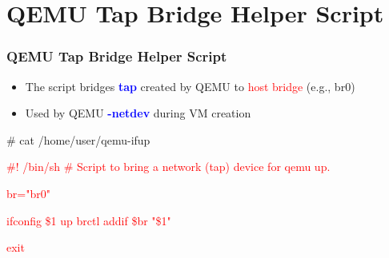 \documentclass[aspectratio=169]{beamer}
\begin{document}
\section{QEMU Tap Bridge Helper Script}
\begin{frame}
\frametitle{QEMU Tap Bridge Helper Script}
\begin{itemize}
\item The script bridges \textbf{\textcolor{blue}{tap}} created by QEMU to \textcolor{red}{host bridge} (e.g., br0)
\item Used by QEMU \textbf{\textcolor{blue}{-netdev}} during VM creation
\end{itemize}
\begin{block}{}
\# cat /home/user/qemu-ifup \newline

\textcolor{red}{\#! /bin/sh} \newline
\textcolor{red}{\# Script to bring a network (tap) device for qemu up.} \newline

\textcolor{red}{br="br0"} \newline

\textcolor{red}{ifconfig \$1 up} \newline
\textcolor{red}{brctl addif \$br "\$1"} \newline

\textcolor{red}{exit}
\end{block}
\end{frame}

\end{document}

